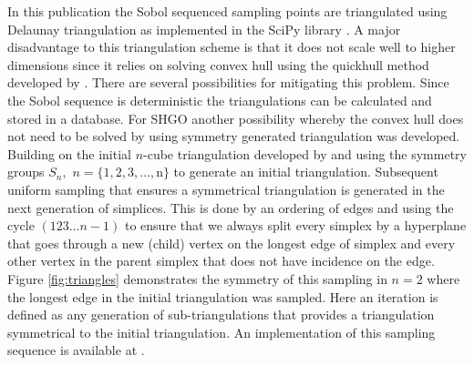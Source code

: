 In this publication the Sobol sequenced sampling points are triangulated using Delaunay triangulation as implemented in the SciPy library \cite{scipy}. A major disadvantage to this triangulation scheme is that it does not scale well to higher dimensions since it relies on solving convex hull using the quickhull method developed by \citet{Barber1996}. %
There are several possibilities for mitigating this problem. Since the Sobol sequence is deterministic the triangulations can be calculated and stored in a database. For SHGO another possibility whereby the convex hull does not need to be solved by using symmetry generated triangulation was developed. Building on the initial $n$-cube triangulation developed by \citeauthor{paulavivcius2014simplicial} \cite{paulavivcius2014simplicial, Zilinskas2016} and using the symmetry groups $S_n,$ $n = \{1, 2, 3, \dots, $n$\}$ to generate an initial triangulation. Subsequent uniform sampling that ensures a symmetrical triangulation is generated in the next generation of simplices. This is done by an ordering of edges and using the cycle $(123 \dots n-1)$ to ensure that we always split every simplex by a hyperplane that goes through a new (child) vertex on the longest edge of simplex and every other vertex in the parent simplex that does not have incidence on the edge. Figure \ref{fig:triangles} demonstrates the symmetry of this sampling in $n=2$ where the longest edge in the initial triangulation was sampled. Here an iteration is defined as any generation of sub-triangulations that provides a triangulation symmetrical to the initial triangulation. An implementation of this sampling sequence is available at \cite{SHGOpy}.

